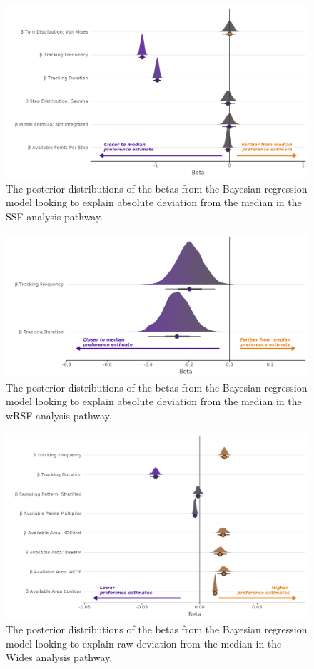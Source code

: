 \documentclass[10pt,a4paper]{article}
\begin{document}
\begin{figure}
\includegraphics[width=1\linewidth]{../figures/ssf_dEstSSF_effectsPlot} \caption{The posterior distributions of the betas from the Bayesian regression model looking to explain absolute deviation from the median in the SSF analysis pathway.}\label{fig:dEstBetasSSF}
\end{figure}

\begin{figure}
\includegraphics[width=1\linewidth]{../figures/wrsf_dEstwrsf_effectsPlot} \caption{The posterior distributions of the betas from the Bayesian regression model looking to explain absolute deviation from the median in the wRSF analysis pathway.}\label{fig:dEstBetasWRSF}
\end{figure}

\begin{figure}
\includegraphics[width=1\linewidth]{../figures/wides_rEstWides_effectsPlot} \caption{The posterior distributions of the betas from the Bayesian regression model looking to explain raw deviation from the median in the Wides analysis pathway.}\label{fig:rEstBetasWides}
\end{figure}
\end{document}
